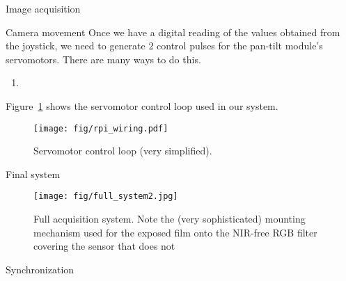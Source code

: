 \documentclass[11pt]{article}
\begin{document}
\begin{section}{Image acquisition}
\begin{subsubsection}{Camera movement}
        Once we have a digital reading of the values obtained from the joystick, we need to generate 2 control pulses for the pan-tilt module's servomotors. There are many ways to do this.

        \begin{enumerate}
            \item
        \end{enumerate}

        Figure~\ref{fig:servomotor_control_loop} shows the servomotor control loop used in our system.

        \begin{figure}[!h]
            \begin{center}
                \texttt{[image: fig/rpi\_wiring.pdf]}
                \caption{Servomotor control loop (very simplified).}
                \label{fig:servomotor_control_loop}
            \end{center}
        \end{figure}
    \end{subsubsection}

    \begin{subsubsection}{Final system}
        \begin{figure}[!h]
            \begin{center}
                \texttt{[image: fig/full\_system2.jpg]}
                \caption{Full acquisition system. Note the (very sophisticated) mounting mechanism used for the exposed film onto the NIR-free  RGB filter covering the sensor that does not }
                \label{fig:full_system}
            \end{center}
        \end{figure}
    \end{subsubsection}

    \begin{subsection}{Synchronization}
        \label{sec:synchronization}
    \end{subsection} %


\end{section}
\end{document}
